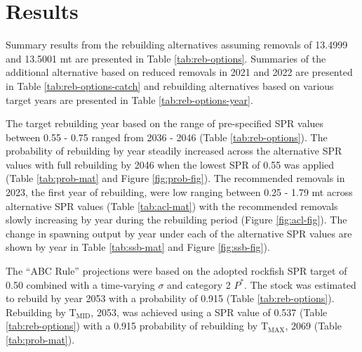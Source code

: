 \documentclass[11pt,
  english,
  a4paper,
]{article}
\begin{document}
\leavevmode\tagmcend\tagstructend\par


\hypertarget{results}{%
\section{Results}\label{results}}

\leavevmode\tagmcend\tagstructend


Summary results from the rebuilding alternatives assuming removals of 13.4999 and 13.5001 mt are presented in Table \ref{tab:reb-options}. Summaries of the additional alternative based on reduced removals in 2021 and 2022 are presented in Table \ref{tab:reb-options-catch} and rebuilding alternatives based on various target years are presented in Table \ref{tab:reb-options-year}.

\leavevmode\tagmcend\tagstructend\par


The target rebuilding year based on the range of pre-specified SPR values between 0.55 - 0.75 ranged from 2036 - 2046 (Table \ref{tab:reb-options}). The probability of rebuilding by year steadily increased across the alternative SPR values with full rebuilding by 2046 when the lowest SPR of 0.55 was applied (Table \ref{tab:prob-mat} and Figure \ref{fig:prob-fig}). The recommended removals in 2023, the first year of rebuilding, were low ranging between 0.25 - 1.79 mt across alternative SPR values (Table \ref{tab:acl-mat}) with the recommended removals slowly increasing by year during the rebuilding period (Figure \ref{fig:acl-fig}). The change in spawning output by year under each of the alternative SPR values are shown by year in Table \ref{tab:ssb-mat} and Figure \ref{fig:ssb-fig}).

\leavevmode\tagmcend\tagstructend\par


The ``ABC Rule'' projections were based on the adopted rockfish SPR target of 0.50 combined with a time-varying {\(\sigma\)\leavevmode\tagmcend\tagstructend} and category 2 {\(P^*\)\leavevmode\tagmcend\tagstructend}. The stock was estimated to rebuild by year 2053 with a probability of 0.915 (Table \ref{tab:reb-options}). Rebuilding by {\(\text{T}_\text{MID}\)\leavevmode\tagmcend\tagstructend}, 2053, was achieved using a SPR value of 0.537 (Table \ref{tab:reb-options}) with a 0.915 probability of rebuilding by {\(\text{T}_\text{MAX}\)\leavevmode\tagmcend\tagstructend}, 2069 (Table \ref{tab:prob-mat}).
\end{document}

